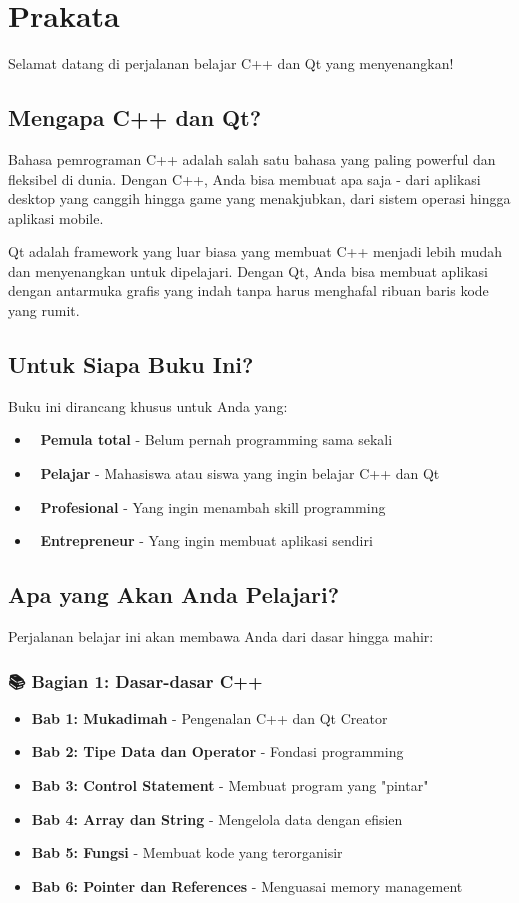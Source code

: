 \chapter*{Prakata}

Selamat datang di perjalanan belajar C++ dan Qt yang menyenangkan! 🎉

\section*{Mengapa C++ dan Qt?}

Bahasa pemrograman C++ adalah salah satu bahasa yang paling powerful dan fleksibel di dunia. Dengan C++, Anda bisa membuat apa saja - dari aplikasi desktop yang canggih hingga game yang menakjubkan, dari sistem operasi hingga aplikasi mobile.

Qt adalah framework yang luar biasa yang membuat C++ menjadi lebih mudah dan menyenangkan untuk dipelajari. Dengan Qt, Anda bisa membuat aplikasi dengan antarmuka grafis yang indah tanpa harus menghafal ribuan baris kode yang rumit.

\section*{Untuk Siapa Buku Ini?}

Buku ini dirancang khusus untuk Anda yang:
\begin{itemize}
\item 🔰 \textbf{Pemula total} - Belum pernah programming sama sekali
\item 🎯 \textbf{Pelajar} - Mahasiswa atau siswa yang ingin belajar C++ dan Qt
\item 💼 \textbf{Profesional} - Yang ingin menambah skill programming
\item 🚀 \textbf{Entrepreneur} - Yang ingin membuat aplikasi sendiri
\end{itemize}

\section*{Apa yang Akan Anda Pelajari?}

Perjalanan belajar ini akan membawa Anda dari dasar hingga mahir:

\subsection*{📚 Bagian 1: Dasar-dasar C++}
\begin{itemize}
\item \textbf{Bab 1: Mukadimah} - Pengenalan C++ dan Qt Creator
\item \textbf{Bab 2: Tipe Data dan Operator} - Fondasi programming
\item \textbf{Bab 3: Control Statement} - Membuat program yang "pintar"
\item \textbf{Bab 4: Array dan String} - Mengelola data dengan efisien
\item \textbf{Bab 5: Fungsi} - Membuat kode yang terorganisir
\item \textbf{Bab 6: Pointer dan References} - Menguasai memory management
\end{itemize}

